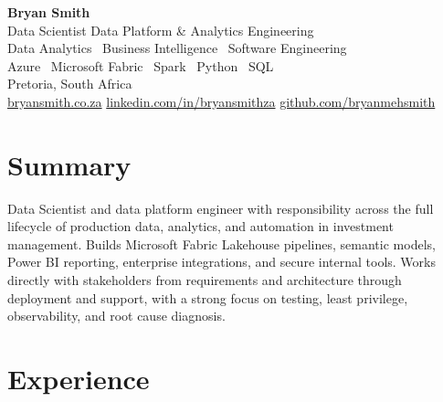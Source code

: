 \documentclass[10pt,a4paper]{article}
\begin{document}
{\centering
  {\Huge\bfseries Bryan Smith}\\[4pt]
  {\large Data Scientist \textbar{} Data Platform \& Analytics Engineering}\\[4pt]
  \textcolor{muted}{Data Analytics \textbullet\ Business Intelligence \textbullet\ Software Engineering}\\[2pt]
  \textcolor{muted}{Azure \textbullet\ Microsoft Fabric \textbullet\ Spark \textbullet\ Python \textbullet\ SQL}\\[2pt]
  \textcolor{muted}{Pretoria, South Africa}\\[2pt]
  \href{https://bryansmith.co.za}{bryansmith.co.za} \quad\textbullet\quad
  \href{https://www.linkedin.com/in/bryansmithza/}{linkedin.com/in/bryansmithza} \quad\textbullet\quad
  \href{https://github.com/bryanmehsmith}{github.com/bryanmehsmith}
  \par}

\vspace{8pt}

\section*{Summary}
Data Scientist and data platform engineer with responsibility across the full lifecycle of production data,
analytics, and automation in investment management. Builds Microsoft Fabric Lakehouse pipelines, semantic models,
Power BI reporting, enterprise integrations, and secure internal tools. Works directly with stakeholders
from requirements and architecture through deployment and support, with a strong focus on testing, least
privilege, observability, and root cause diagnosis.

\section*{Experience}
\end{document}
